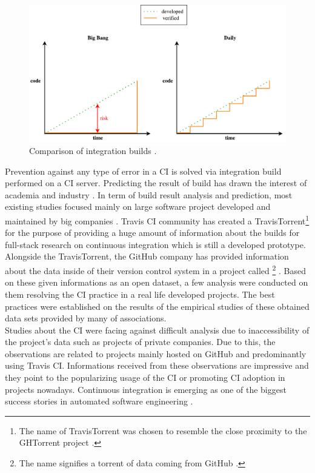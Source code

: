 \begin{figure}[H]
    \centering
    \includegraphics[scale=0.5]{img/big_bang_vs_daily_build.pdf}
    \caption{Comparison of integration builds \cite{AaltoUniversity}.}
    \label{fig:integration}
\end{figure}

Prevention against any type of error in a CI is solved via integration build performed on a CI server. Predicting the result of build has drawn the interest of academia and industry \cite{ResultsOfCIbuild}. In term of build result analysis and prediction, most existing studies focused mainly on large software project developed and maintained by big companies \cite{ResultsOfCIbuild}. Travis CI community has created a TravisTorrent\footnote{The name of TravisTorrent was chosen to resemble the close proximity to the GHTorrent project \cite{TravisTorrentWEBPAGE}.} \cite{TravisTorrent} for the purpose of providing a huge amount of information about the builds for full-stack research on continuous integration which is still a developed prototype. Alongside the TravisTorrent, the GitHub company has provided information about the data inside of their version control system in a project called \footnote{The name signifies a torrent of data coming from GitHub \cite{GHTorrentWEBPAGE}.} \cite{GHTorrent}. Based on these given informations as an open dataset, a few analysis were conducted on them resolving the CI practice in a real life developed projects. The best practices were established on the results of the empirical studies of these obtained data sets provided by many of associations.\\

Studies about the CI were facing against difficult analysis due to inaccessibility of the project's data such as projects of private companies. Due to this, the observations are related to projects mainly hosted on GitHub and predominantly using Travis CI. Informations received from these observations are impressive and they point to the popularizing usage of the CI or promoting CI adoption in projects nowadays. Continuous integration is emerging as one of the biggest success stories in automated software engineering \cite{COPE}.\\

